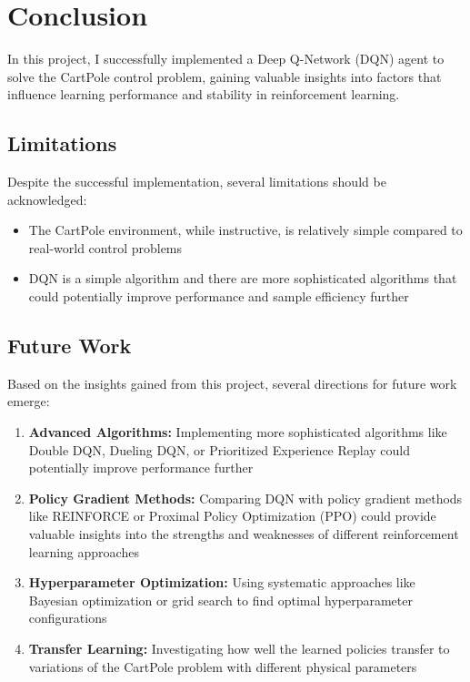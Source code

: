 \documentclass{article}
\begin{document}
\section{Conclusion}
In this project, I successfully implemented a Deep Q-Network (DQN) agent to solve the CartPole control problem, gaining valuable insights into factors that influence learning performance and stability in reinforcement learning.

\subsection{Limitations}
Despite the successful implementation, several limitations should be acknowledged:

\begin{itemize}
    \item The CartPole environment, while instructive, is relatively simple compared to real-world control problems
    \item DQN is a simple algorithm and there are more sophisticated algorithms that could potentially improve performance and sample efficiency further
\end{itemize}

\subsection{Future Work}
Based on the insights gained from this project, several directions for future work emerge:

\begin{enumerate}
    \item \textbf{Advanced Algorithms:} Implementing more sophisticated algorithms like Double DQN, Dueling DQN, or Prioritized Experience Replay could potentially improve performance further
    
    \item \textbf{Policy Gradient Methods:} Comparing DQN with policy gradient methods like REINFORCE or Proximal Policy Optimization (PPO) could provide valuable insights into the strengths and weaknesses of different reinforcement learning approaches
    
    \item \textbf{Hyperparameter Optimization:} Using systematic approaches like Bayesian optimization or grid search to find optimal hyperparameter configurations
    
    \item \textbf{Transfer Learning:} Investigating how well the learned policies transfer to variations of the CartPole problem with different physical parameters
\end{enumerate}
\end{document}
